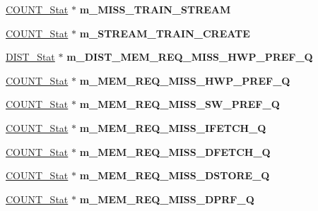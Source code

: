 \begin{DoxyCompactItemize}
\item 
\hypertarget{classall__stats__c_a241adefb0c66b83ba1568aa6b93e3998}{
\hyperlink{classCOUNT__Stat}{COUNT\_\-Stat} $\ast$ {\bfseries m\_\-MISS\_\-TRAIN\_\-STREAM}}
\label{classall__stats__c_a241adefb0c66b83ba1568aa6b93e3998}

\item 
\hypertarget{classall__stats__c_afb40396705c51fe830969508e914a1da}{
\hyperlink{classCOUNT__Stat}{COUNT\_\-Stat} $\ast$ {\bfseries m\_\-STREAM\_\-TRAIN\_\-CREATE}}
\label{classall__stats__c_afb40396705c51fe830969508e914a1da}

\item 
\hypertarget{classall__stats__c_acc7e4a99cc289e5b7c213df868ab8888}{
\hyperlink{classDIST__Stat}{DIST\_\-Stat} $\ast$ {\bfseries m\_\-DIST\_\-MEM\_\-REQ\_\-MISS\_\-HWP\_\-PREF\_\-Q}}
\label{classall__stats__c_acc7e4a99cc289e5b7c213df868ab8888}

\item 
\hypertarget{classall__stats__c_a3d332c8c02efa12b8b4fbcf6c25b39fa}{
\hyperlink{classCOUNT__Stat}{COUNT\_\-Stat} $\ast$ {\bfseries m\_\-MEM\_\-REQ\_\-MISS\_\-HWP\_\-PREF\_\-Q}}
\label{classall__stats__c_a3d332c8c02efa12b8b4fbcf6c25b39fa}

\item 
\hypertarget{classall__stats__c_ae17e41a311895458a4f49e796fab90bd}{
\hyperlink{classCOUNT__Stat}{COUNT\_\-Stat} $\ast$ {\bfseries m\_\-MEM\_\-REQ\_\-MISS\_\-SW\_\-PREF\_\-Q}}
\label{classall__stats__c_ae17e41a311895458a4f49e796fab90bd}

\item 
\hypertarget{classall__stats__c_a08fa0b17c98482eb7b7bd707b528d9b9}{
\hyperlink{classCOUNT__Stat}{COUNT\_\-Stat} $\ast$ {\bfseries m\_\-MEM\_\-REQ\_\-MISS\_\-IFETCH\_\-Q}}
\label{classall__stats__c_a08fa0b17c98482eb7b7bd707b528d9b9}

\item 
\hypertarget{classall__stats__c_aaa40ca8d24394009f96ae3d561ddb048}{
\hyperlink{classCOUNT__Stat}{COUNT\_\-Stat} $\ast$ {\bfseries m\_\-MEM\_\-REQ\_\-MISS\_\-DFETCH\_\-Q}}
\label{classall__stats__c_aaa40ca8d24394009f96ae3d561ddb048}

\item 
\hypertarget{classall__stats__c_ae7e9e6ff12f31a4dd61071a0eb414744}{
\hyperlink{classCOUNT__Stat}{COUNT\_\-Stat} $\ast$ {\bfseries m\_\-MEM\_\-REQ\_\-MISS\_\-DSTORE\_\-Q}}
\label{classall__stats__c_ae7e9e6ff12f31a4dd61071a0eb414744}

\item 
\hypertarget{classall__stats__c_a411da6934fd580c00f35b1282b489af1}{
\hyperlink{classCOUNT__Stat}{COUNT\_\-Stat} $\ast$ {\bfseries m\_\-MEM\_\-REQ\_\-MISS\_\-DPRF\_\-Q}}
\label{classall__stats__c_a411da6934fd580c00f35b1282b489af1}


\end{DoxyCompactItemize}
